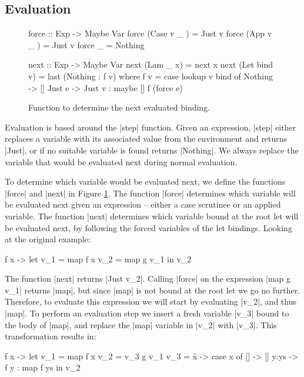 \documentclass[draft]{sigplanconf}
\begin{document}
\subsection{Evaluation}
\label{sec:eval}

\begin{figure}
\begin{code}
force :: Exp -> Maybe Var
force (Case  v _  )  = Just v
force (App   v _  )  = Just v
force _              = Nothing

next :: Exp -> Maybe Var
next (Lam _ x) = next x
next (Let bind v) = last (Nothing : f v)
    where f v = case  lookup v bind of
                      Nothing -> []
                      Just e -> Just v : maybe [] f (force e)
\end{code}
\caption{Function to determine the next evaluated binding.}
\label{fig:stack}
\end{figure}

Evaluation is based around the |step| function. Given an expression, |step| either replaces a variable with its associated value from the environment and returns |Just|, or if no suitable variable is found returns |Nothing|. We always replace the variable that would be evaluated next during normal evaluation.

To determine which variable would be evaluated next, we define the functions |force| and |next| in Figure \ref{fig:stack}. The function |force| determines which variable will be evaluated next given an expression -- either a case scrutinee or an applied variable. The function |next| determines which variable bound at the root let will be evaluated next, by following the forced variables of the let bindings. Looking at the original example:

\begin{code}
\g f x ->  let  v_1 =  map f x
                v_2 =  map g v_1
           in   v_2
\end{code}

The function |next| returns |Just v_2|. Calling |force| on the expression |map g v_1| returns |map|, but since |map| is not bound at the root let we go no further. Therefore, to evaluate this expression we will start by evaluating |v_2|, and thus |map|. To perform an evaluation step we insert a fresh variable |v_3| bound to the body of |map|, and replace the |map| variable in |v_2| with |v_3|. This transformation results in:

\begin{code}
\g f x ->  let  v_1 =  map f x
                v_2 =  v_3 g v_1
                v_3 =  \f x -> case  x of
                                     []    -> []
                                     y:ys  -> f y : map f ys
           in   v_2
\end{code}
\end{document}
